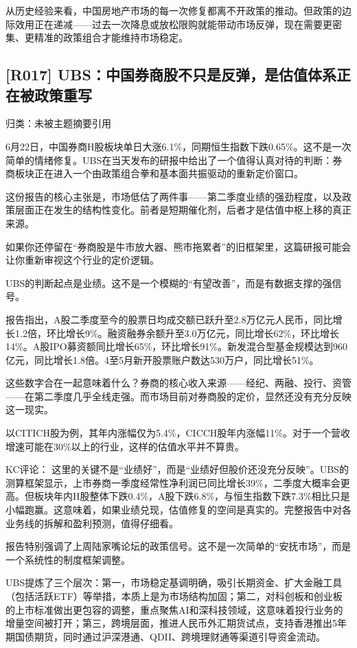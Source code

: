 \documentclass[11pt]{ctexart}
\begin{document}
从历史经验来看，中国房地产市场的每一次修复都离不开政策的推动。但政策的边际效用正在递减——过去一次降息或放松限购就能带动市场反弹，现在需要更密集、更精准的政策组合才能维持市场稳定。

\subsection{[R017] UBS：中国券商股不只是反弹，是估值体系正在被政策重写}
{\small\color{refgray}归类：未被主题摘要引用}

6月22日，中国券商H股板块单日大涨6.1\%，同期恒生指数下跌0.65\%。这不是一次简单的情绪修复。UBS在当天发布的研报中给出了一个值得认真对待的判断：券商板块正在进入一个由政策组合拳和基本面共振驱动的重新定价窗口。

这份报告的核心主张是，市场低估了两件事——第二季度业绩的强劲程度，以及政策层面正在发生的结构性变化。前者是短期催化剂，后者才是估值中枢上移的真正来源。

如果你还停留在“券商股是牛市放大器、熊市拖累者”的旧框架里，这篇研报可能会让你重新审视这个行业的定价逻辑。

UBS的判断起点是业绩。这不是一个模糊的“有望改善”，而是有数据支撑的强信号。

报告指出，A股二季度至今的股票日均成交额已跃升至2.8万亿元人民币，同比增长1.2倍，环比增长9\%。融资融券余额升至3.0万亿元，同比增长62\%，环比增长14\%。A股IPO募资额同比增长65\%，环比增长91\%。新发混合型基金规模达到960亿元，同比增长1.8倍。4至5月新开股票账户数达530万户，同比增长51\%。

这些数字合在一起意味着什么？券商的核心收入来源——经纪、两融、投行、资管——在第二季度几乎全线走强。而市场目前对券商股的定价，显然还没有充分反映这一现实。

以CITICH股为例，其年内涨幅仅为5.4\%，CICCH股年内涨幅11\%。对于一个营收增速可能在30\%以上的行业，这样的估值水平并不算贵。

KC评论： 这里的关键不是“业绩好”，而是“业绩好但股价还没充分反映”。UBS的测算框架显示，上市券商一季度经常性净利润已同比增长39\%，二季度大概率会更高。但板块年内H股整体下跌0.4\%，A股下跌6.8\%，与恒生指数下跌7.3\%相比只是小幅跑赢。这意味着，如果业绩兑现，估值修复的空间是真实的。完整报告中对各业务线的拆解和盈利预测，值得仔细看。

报告特别强调了上周陆家嘴论坛的政策信号。这不是一次简单的“安抚市场”，而是一个系统性的制度框架调整。

UBS提炼了三个层次：第一，市场稳定基调明确，吸引长期资金、扩大金融工具（包括活跃ETF）等举措，本质上是为市场结构加固；第二，对科创板和创业板的上市标准做出更包容的调整，重点聚焦AI和深科技领域，这意味着投行业务的增量空间被打开；第三，跨境层面，推进人民币外汇期货试点，支持香港推出5年期国债期货，同时通过沪深港通、QDII、跨境理财通等渠道引导资金流动。
\end{document}

